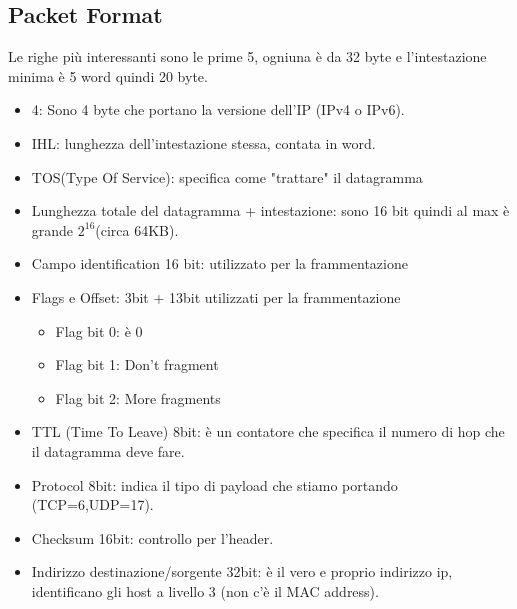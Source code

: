 \subsection{Packet Format}
Le  righe più interessanti sono le prime 5, ogniuna è da 32 byte e l'intestazione minima è 5 word quindi 20 byte.
\begin{itemize}
  \item 4: Sono 4 byte che portano la versione dell'IP (IPv4 o IPv6).
  \item IHL: lunghezza dell'intestazione stessa, contata in word.
  \item TOS(Type Of Service): specifica come "trattare" il datagramma 
  \item Lunghezza totale del datagramma + intestazione: sono 16 bit quindi al max è grande $2^{16}$(circa 64KB).
  \item Campo identification 16 bit: utilizzato per la frammentazione
  \item Flags e Offset: 3bit + 13bit utilizzati per la frammentazione
        \begin{itemize}
          \item Flag bit 0: è 0
          \item Flag bit 1: Don't fragment
          \item Flag bit 2: More fragments
        \end{itemize}
  \item TTL (Time To Leave) 8bit: è un contatore che specifica il numero di hop che il datagramma deve fare.
  \item Protocol 8bit: indica il tipo di payload che stiamo portando (TCP=6,UDP=17).
  \item Checksum 16bit: controllo per l'header.
  \item Indirizzo destinazione/sorgente 32bit: è il vero e proprio indirizzo ip, identificano gli host a livello 3 (non c'è il MAC address).
\end{itemize}
